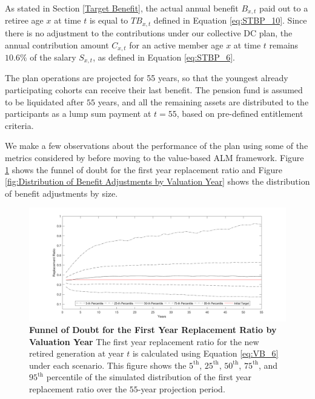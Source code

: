 \documentclass{sfuthesis}
\numberwithin{equation}{chapter}
\begin{document}
		\justify
		As stated in Section \ref{Target Benefit}, the actual annual benefit $B_{x,t}$ paid out to a retiree age $x$ at time $t$ is equal to $TB_{x,t}$ defined in Equation \eqref{eq:STBP_10}. Since there is no adjustment to the contributions under our collective DC plan, the annual contribution amount $C_{x,t}$ for an active member age $x$ at time $t$ remains $10.6\%$ of the salary $S_{x,t}$, as defined in Equation \eqref{eq:STBP_6}. 
	
	
	
		\justify
		The plan operations are projected for 55 years, so that the youngest already participating cohorts can receive their last benefit. The pension fund is assumed to be liquidated after $55$ years, and all the remaining assets are distributed to the participants as a lump sum payment at $t=55$, based on pre-defined entitlement criteria. 
	
	
		\justify
		We make a few observations about the performance of the plan using some of the metrics considered by \citet{Sanders2016a} before moving to the value-based ALM framework. Figure \ref{fig:Funnel of Doubt for the First Year Replacement Ratio by Valuation Year} shows the funnel of doubt for the first year replacement ratio and Figure \ref{fig:Distribution of Benefit Adjustments by Valuation Year} shows the distribution of benefit adjustments by size.
		\begin{figure}[H]
			\includegraphics[width=1\linewidth]{ResultPlot/RR.pdf} 
			\caption[Funnel of Doubt for the First Year Replacement Ratio by Valuation Year]{\textbf{Funnel of Doubt for the First Year Replacement Ratio by Valuation Year}
				\vspace{-0.4cm}
				\newline\footnotesize \justify The first year replacement ratio for the new retired generation at year $t$ is calculated using Equation \eqref{eq:VB_6} under each scenario. This figure shows the $5^{\text{th}}$, $25^{\text{th}}$, $50^{\text{th}}$, $75^{\text{th}}$, and $95^{\text{th}}$ percentile of the simulated distribution of the first year replacement ratio over the $55$-year projection period.}
			\label{fig:Funnel of Doubt for the First Year Replacement Ratio by Valuation Year}
		\end{figure}
		
\end{document}
